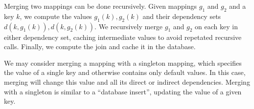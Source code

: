 \documentclass{article}
\begin{document}
        Merging two mappings can be done recursively. Given mappings $g_1$ and $g_2$ and a key $k$, we compute the values $g_1(k), g_2(k)$ and their dependency sets $d(k, g_1(k)), d(k, g_2(k))$. We recursively merge $g_1$ and $g_2$ on each key in either dependency set, caching intermediate values to avoid repetated recursive calls. Finally, we compute the join and cache it in the database.

        We may consider merging a mapping with a singleton mapping, which specifies the value of a single key and otherwise contains only default values. In this case, merging will change this value and all its direct or indirect dependencies. Merging with a singleton is similar to a ``database insert'', updating the value of a given key.
\end{document}
